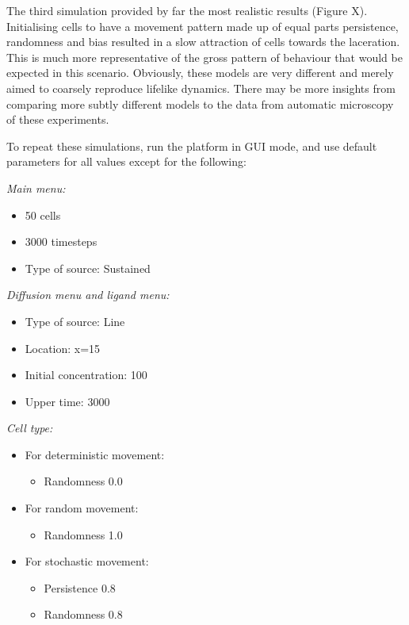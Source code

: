\documentclass[12pt]{article}
\begin{document}
The third simulation provided by far the most realistic results (Figure X). 
Initialising cells to have a movement pattern made up of equal parts 
persistence, randomness and bias resulted in a slow attraction of cells 
towards the laceration. This is much more representative of the gross 
pattern of behaviour that would be expected in this scenario. Obviously, 
these models are very different and merely aimed to coarsely reproduce 
lifelike dynamics. There may be more insights from comparing more subtly 
different models to the data from automatic microscopy of these 
experiments.

To repeat these simulations, run the platform in GUI mode, and use default
parameters for all values except for the following:

{\itshape Main menu:}
\begin{itemize}
  \item 50 cells
  \item 3000 timesteps
  \item Type of source: Sustained
\end{itemize}
{\itshape Diffusion menu and ligand menu:}
\begin{itemize}
\item Type of source: Line
\item Location: x=15
\item Initial concentration: 100
\item Upper time: 3000
\end{itemize}
{\itshape Cell type:}
\begin{itemize}
  \item For deterministic movement:
    \begin{itemize}
      \item Randomness 0.0
    \end{itemize}
  \item For random movement:
    \begin{itemize}
      \item Randomness 1.0
    \end{itemize}
  \item For stochastic movement:
    \begin{itemize}
      \item Persistence 0.8
      \item Randomness 0.8
    \end{itemize}
\end{itemize}
\end{document}
